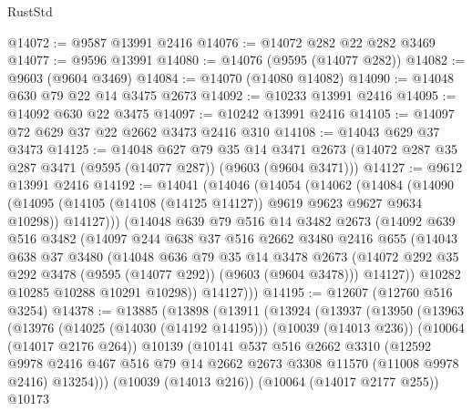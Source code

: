 \begin{lexlean}{RustStd}
\begin{coremodule}
@14072 := @9587 @13991 @2416
@14076 := @14072 @282 @22 @282 @3469
@14077 := @9596 @13991
@14080 := @14076 (@9595 (@14077 @282))
@14082 := @9603 (@9604 @3469)
@14084 := @14070 (@14080 @14082)
@14090 := @14048 @630 @79 @22 @14 @3475 @2673
@14092 := @10233 @13991 @2416
@14095 := @14092 @630 @22 @3475
@14097 := @10242 @13991 @2416
@14105 := @14097 @72 @629 @37 @22 @2662 @3473 @2416 @310
@14108 := @14043 @629 @37 @3473
@14125 := @14048
    @627
    @79
    @35
    @14
    @3471
    @2673
    (@14072 @287 @35 @287 @3471 (@9595 (@14077 @287)) (@9603 (@9604 @3471)))
@14127 := @9612 @13991 @2416
@14192 := @14041
    (@14046
      (@14054
        (@14062
          (@14084
            (@14090
              (@14095 (@14105 (@14108 (@14125 @14127)) @9619 @9623 @9627 @9634 @10298))
              @14127)))
        (@14048
          @639
          @79
          @516
          @14
          @3482
          @2673
          (@14092
            @639
            @516
            @3482
            (@14097
              @244
              @638
              @37
              @516
              @2662
              @3480
              @2416
              @655
              (@14043
                @638
                @37
                @3480
                (@14048
                  @636
                  @79
                  @35
                  @14
                  @3478
                  @2673
                  (@14072 @292 @35 @292 @3478 (@9595 (@14077 @292)) (@9603 (@9604 @3478)))
                  @14127))
              @10282
              @10285
              @10288
              @10291
              @10298))
          @14127)))
@14195 := @12607 (@12760 @516 @3254)
@14378 := @13885
    (@13898
      (@13911
        (@13924
          (@13937
            (@13950
              (@13963
                (@13976
                  (@14025 (@14030 (@14192 @14195)))
                  (@10039 (@14013 @236))
                  (@10064 (@14017 @2176 @264))
                  @10139
                  (@10141
                    @537
                    @516
                    @2662
                    @3310
                    (@12592
                      @9978
                      @2416
                      @467
                      @516
                      @79
                      @14
                      @2662
                      @2673
                      @3308
                      @11570
                      (@11008 @9978 @2416)
                      @13254)))
                (@10039 (@14013 @216))
                (@10064 (@14017 @2177 @255))
                @10173

\end{coremodule}
\end{lexlean}
